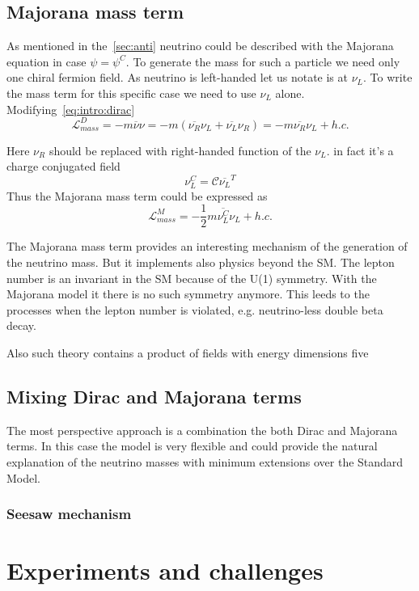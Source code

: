 \documentclass[../main.tex]{subfiles}
\begin{document}
\subsection{Majorana mass term}
As mentioned in the~\autoref{sec:anti} neutrino could be described with the Majorana equation in case $\psi=\psi^C$. To generate the mass for such a particle we need only one chiral fermion field. As neutrino is left-handed let us notate is at $\nu_L$. To write the mass term for this specific case we need to use $\nu_L$ alone. Modifying~\autoref{eq:intro:dirac}
\begin{equation}
\mathcal{L}^D_{mass}=-m\overline{\nu}\nu=-m\left(\overline{\nu_R}\nu_L+\overline{\nu_L}\nu_R\right)=-m\overline{\nu_R}\nu_L+h.c.
\end{equation}

Here $\nu_R$ should be replaced with right-handed function of the $\nu_L$. in fact it's a charge conjugated field
\begin{equation}
\nu_L^C=\mathcal{C}\overline{\nu_L}^T
\end{equation}
Thus the Majorana mass term could be expressed as
\begin{equation}
\mathcal{L}^M_{mass}=-\frac{1}{2}m\overline{\nu_L^C}\nu_L+h.c.
\end{equation}

The Majorana mass term provides an interesting mechanism of the generation of the neutrino mass. But it implements also physics beyond the SM. The lepton number is an invariant in the SM because of the U(1) symmetry. With the Majorana model it there is no such symmetry anymore. This leeds to the processes when the lepton number is violated, e.g. neutrino-less double beta decay.

Also such theory contains a product of fields with energy dimensions five


\subsection{Mixing Dirac and Majorana terms}
The most perspective approach is a combination the both Dirac and Majorana terms. In this case the model is very flexible and could provide the natural explanation of the neutrino masses with minimum extensions over the Standard Model.

\subsubsection{Seesaw mechanism}



\section{Experiments and challenges}
\end{document}
